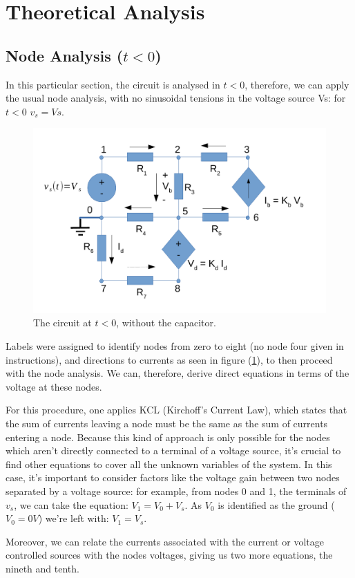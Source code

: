 \section{Theoretical Analysis}
\label{sec:analysis}



\subsection{Node Analysis ($t<0$)}

In this particular section, the circuit is analysed in $t<0$, therefore, we can apply the usual node analysis, with no sinusoidal tensions in the voltage source Vs: for $t<0$ $v_s = Vs$.

\begin{figure}[h] \centering
\includegraphics[width=0.5\linewidth]{t2-t1.pdf}
\caption{The circuit at $t<0$, without the capacitor.}
\label{fig2}
\end{figure}

Labels were assigned to identify nodes from zero to eight (no node four given in instructions), and directions to currents as seen in figure (\ref{fig2}), to then proceed with the node analysis.  We can, therefore, derive direct equations in terms of the voltage at these nodes.

For this procedure, one applies KCL (Kirchoff's Current Law), which states that the sum of currents leaving a node must be the same as the sum of currents entering a node. Because this kind of approach is only possible for the nodes which aren't directly connected to a terminal of a voltage source, it's crucial to find other equations to cover all the unknown variables of the system. In this case, it's important to consider factors like the voltage gain between two nodes separated by a voltage source: for example, from nodes 0 and 1, the terminals of $v_s$, we can take the equation: $V_1 = V_0 + V_s$. As $V_0$ is identified as the ground ($V_0 = 0V$) we're left with: $V_1 = V_s$.

Moreover, we can relate the currents associated with the current or voltage controlled sources with the nodes voltages, giving us two more equations, the nineth and tenth.

